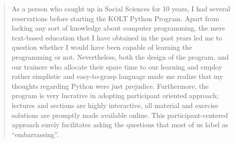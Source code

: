 \begin{frame}
\begin{columns}
\begin{column}{0.3\textwidth}
          \end{column}
          \begin{column}{0.7\textwidth}
            \begin{quote}
              As a person who caught up in Social Sciences for 10 years, I had several reservations before starting the KOLT Python Program. Apart from lacking any sort of knowledge about computer programming, the mere text-based education that I have obtained in the past years led me to question whether I would have been capable of learning the programming or not. Nevertheless, both the design of the program, and our trainers who allocate their spare time to our learning and employ rather simplistic and easy-to-grasp language made me realize that my thoughts regarding Python were just prejudice. Furthermore, the program is very lucrative in adopting participant oriented approach; lectures and sections are highly interactive, all material and exercise solutions are promptly made available online. This participant-centered approach surely facilitates asking the questions that most of us label as “embarrassing”.                          
            \end{quote}
          \end{column}
        \end{columns}
      \end{frame}

